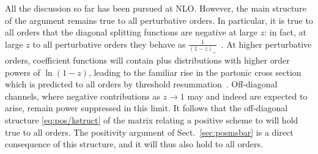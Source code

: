 All the discussion so far has been pursued at NLO\@. However, the main
structure of the argument remains true to all perturbative orders. In
particular,  it is true to all orders that the diagonal splitting
functions are negative at large $z$: in fact, at large $z$ to all
perturbative orders they behave as $\frac{1}{(1-z)_+}$~\cite{Albino:2000cp}. At higher
perturbative orders, coefficient functions will contain plus distributions with higher order
powers of $\ln(1-z)$, leading to  the familiar rise in the partonic
cross section which is predicted to all orders by threshold
resummation~\cite{Catani:1989ne,Sterman:1986aj}. Off-diagonal
channels, where negative contributions as $z\to1$ may and indeed are
expected to arise, 
remain power suppressed in this limit. It follows that the
off-diagonal structure \cref{eq:pos/kstruct}
of the matrix relating a positive scheme to \msbar{} will hold true to
all orders. The positivity argument of Sect.~\ref{sec:posmsbar} is a
direct consequence of this structure, and it will thus also hold to
all orders.

